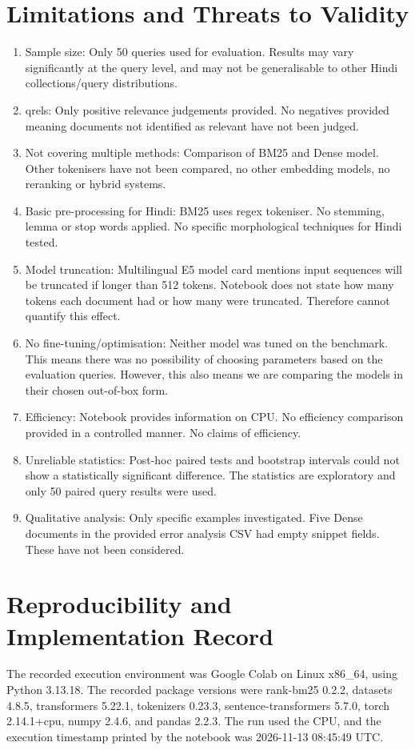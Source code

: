\documentclass[10pt]{article}
\begin{document}
\section{Limitations and Threats to Validity}
\begin{enumerate}[leftmargin=*,itemsep=2pt]
\item Sample size: Only 50 queries used for evaluation. Results may vary significantly at the query level, and may not be generalisable to other Hindi collections/query distributions.
\item qrels: Only positive relevance judgements provided. No negatives provided meaning documents not identified as relevant have not been judged.
\item Not covering multiple methods: Comparison of BM25 and Dense model. Other tokenisers have not been compared, no other embedding models, no reranking or hybrid systems.
\item Basic pre-processing for Hindi: BM25 uses regex tokeniser. No stemming, lemma or stop words applied. No specific morphological techniques for Hindi tested.
\item Model truncation: Multilingual E5 model card mentions input sequences will be truncated if longer than 512 tokens. Notebook does not state how many tokens each document had or how many were truncated. Therefore cannot quantify this effect.
\item No fine-tuning/optimisation: Neither model was tuned on the benchmark. This means there was no possibility of choosing parameters based on the evaluation queries. However, this also means we are comparing the models in their chosen out-of-box form.
\item Efficiency: Notebook provides information on CPU. No efficiency comparison provided in a controlled manner. No claims of efficiency.
\item Unreliable statistics: Post-hoc paired tests and bootstrap intervals could not show a statistically significant difference. The statistics are exploratory and only 50 paired query results were used.
\item Qualitative analysis: Only specific examples investigated. Five Dense documents in the provided error analysis CSV had empty snippet fields. These have not been considered.
\end{enumerate}

\section{Reproducibility and Implementation Record}
The recorded execution environment was Google Colab on Linux x86\_64, using Python 3.13.18. The recorded package versions were rank-bm25 0.2.2, datasets 4.8.5, transformers 5.22.1, tokenizers 0.23.3, sentence-transformers 5.7.0, torch 2.14.1+cpu, numpy 2.4.6, and pandas 2.2.3. The run used the CPU, and the execution timestamp printed by the notebook was 2026-11-13 08:45:49 UTC.
\end{document}
